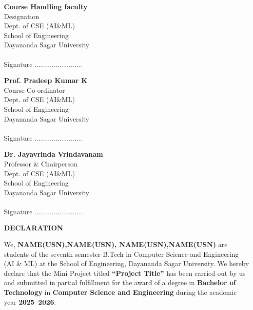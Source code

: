 \documentclass[ 12pt,a4paper,twocolumn,fleqn]{report}
\begin{document}
\begin{minipage}[t]{0.31\textwidth}
\small
  \textbf{Course Handling faculty}\\
  Designation\\
  Dept. of CSE (AI\&ML)\\
  School of Engineering\\
  Dayananda Sagar University\\
  \\
  Signature .........................\\
\end{minipage}%
\hfill
\begin{minipage}[t]{0.31\textwidth}
\small
  \textbf{Prof. Pradeep Kumar K}\\
  Course Co-ordinator\\
  Dept. of CSE (AI\&ML)\\
  School of Engineering\\
  Dayananda Sagar University\\
  \\
  Signature .........................\\
\end{minipage}%
\hfill
\begin{minipage}[t]{0.34\textwidth}
\small
  \textbf{Dr. Jayavrinda Vrindavanam}\\
  Professor \& Chairperson\\
  Dept. of CSE (AI\&ML)\\
  School of Engineering\\
  Dayananda Sagar University \\
  \\
  Signature .........................\\
\end{minipage}



\newpage
  \pagestyle{plain}
\thisfancypage{%
  \setlength{\fboxsep}{20pt}\doublebox}{}
  \begin{center}
    \huge\textbf{DECLARATION}
\end{center}
\vspace{15mm}
We, \textbf{NAME(USN),NAME(USN), NAME(USN),NAME(USN) } are students of the seventh semester B.Tech in Computer Science and Engineering (AI \& ML) at the School of Engineering, Dayananda Sagar University. We hereby declare that the Mini Project titled \textbf{“Project Title”} has been carried out by us and submitted in partial fulfillment for the award of a degree in \textbf{Bachelor of Technology} in \textbf{Computer Science and Engineering} during the academic year \textbf{2025--2026}.
\vspace{15 mm}
\end{document}
